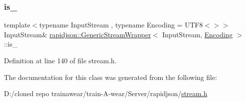 \subsubsection{\texorpdfstring{is\_}{is\_}}
{\footnotesize\ttfamily template$<$typename Input\+Stream , typename Encoding  = U\+T\+F8$<$$>$$>$ \\
Input\+Stream\& \mbox{\hyperlink{classrapidjson_1_1_generic_stream_wrapper}{rapidjson\+::\+Generic\+Stream\+Wrapper}}$<$ Input\+Stream, \mbox{\hyperlink{classrapidjson_1_1_encoding}{Encoding}} $>$\+::is\+\_\+\hspace{0.3cm}{\ttfamily [protected]}}



Definition at line 140 of file stream.\+h.



The documentation for this class was generated from the following file\+:\begin{DoxyCompactItemize}
\item 
D\+:/cloned repo trainawear/train-\/\+A-\/wear/\+Server/rapidjson/\mbox{\hyperlink{stream_8h}{stream.\+h}}\end{DoxyCompactItemize}
